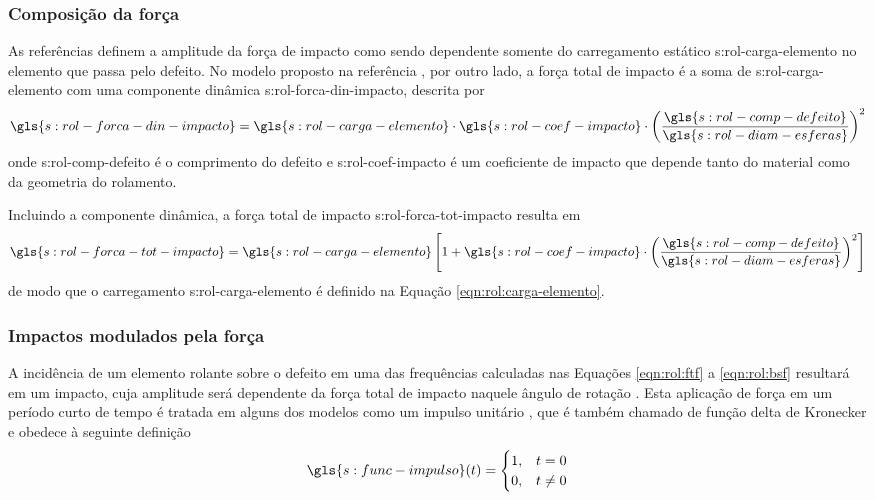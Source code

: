 \documentclass[12pt,oneside,english,brazil,lmodern,siglas,simbolos,cite=num]{ucsmonograph}
\begin{document}
	\subsubsection{Composição da força}
	As referências \cite{mcfadden:1984,tandon:1997} definem a amplitude da força de impacto como sendo dependente somente do carregamento estático \gls{s:rol-carga-elemento} no elemento que passa pelo defeito.
	No modelo proposto na referência \cite{sassi:2007}, por outro lado, a força total de impacto é a soma de \gls{s:rol-carga-elemento} com uma componente dinâmica \gls{s:rol-forca-din-impacto}, descrita por
	\begin{equation}
		\gls{s:rol-forca-din-impacto} =
		\gls{s:rol-carga-elemento}\cdot\gls{s:rol-coef-impacto}\cdot
		\left(\frac{\gls{s:rol-comp-defeito}}
		{\gls{s:rol-diam-esferas}}\right)^2
	\end{equation}
	onde \gls{s:rol-comp-defeito} é o comprimento do defeito e \gls{s:rol-coef-impacto} é um coeficiente de impacto que depende tanto do material como da geometria do rolamento.
	
	Incluindo a componente dinâmica, a força total de impacto \gls{s:rol-forca-tot-impacto} resulta em
	\begin{equation} \label{eqn:rol:forca-impacto-tot}
		\gls{s:rol-forca-tot-impacto} = \gls{s:rol-carga-elemento}
		\left[1 + \gls{s:rol-coef-impacto}\cdot
		\left(\frac{\gls{s:rol-comp-defeito}}
		{\gls{s:rol-diam-esferas}}\right)^2 \right]
	\end{equation}
	de modo que o carregamento \gls{s:rol-carga-elemento} é definido na Equação \ref{eqn:rol:carga-elemento}.
	
	\subsubsection{Impactos modulados pela força}
	A incidência de um elemento rolante sobre o defeito em uma das frequências calculadas nas Equações \ref{eqn:rol:ftf} a \ref{eqn:rol:bsf} resultará em um impacto, cuja amplitude será dependente da força total de impacto naquele ângulo de rotação \cite{mcfadden:1984}.
	Esta aplicação de força em um período curto de tempo é tratada em alguns dos modelos como um impulso unitário \cite{mcfadden:1984,sassi:2007,cong:2013}, que é também chamado de função delta de Kronecker e obedece à seguinte definição \cite{rao:2008}
	\begin{equation}
		\gls{s:func-impulso}(t) = 
		\begin{cases}
			1,& t=0\\
			0,& t\ne 0
		\end{cases}
	\end{equation}
	
\end{document}
